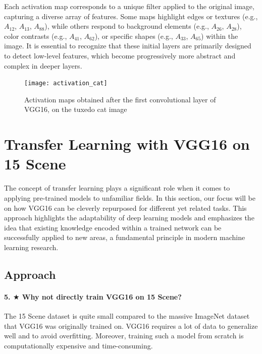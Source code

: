 Each activation map corresponds to a unique filter applied to the original image, capturing a diverse array of features. Some maps highlight edges or textures (e.g., $A_{12}$, $A_{13}$, $A_{88}$), while others respond to background elements (e.g., $A_{26}$, $A_{28}$), color contrasts (e.g., $A_{41}$, $A_{62}$), or specific shapes (e.g., $A_{33}$, $A_{65}$) within the image. It is essential to recognize that these initial layers are primarily designed to detect low-level features, which become progressively more abstract and complex in deeper layers.

\begin{figure}[H]
    \centering
    \texttt{[image: activation\_cat]}
    \caption{Activation maps obtained after the first convolutional layer of VGG16, on the tuxedo cat image}
    \label{fig:activation_cat}
\end{figure}

\section{Transfer Learning with VGG16 on 15 Scene}

The concept of transfer learning plays a significant role when it comes to applying pre-trained models to unfamiliar fields. In this section, our focus will be on how VGG16 can be cleverly repurposed for different yet related tasks. This approach highlights the adaptability of deep learning models and emphasizes the idea that existing knowledge encoded within a trained network can be successfully applied to new areas, a fundamental principle in modern machine learning research.

\subsection{Approach}
\paragraph{5. $\bigstar$ Why not directly train VGG16 on 15 Scene?}
The 15 Scene dataset is quite small compared to the massive ImageNet dataset that VGG16 was originally trained on. VGG16 requires a lot of data to generalize well and to avoid overfitting. Moreover, training such a model from scratch is computationally expensive and time-consuming.


